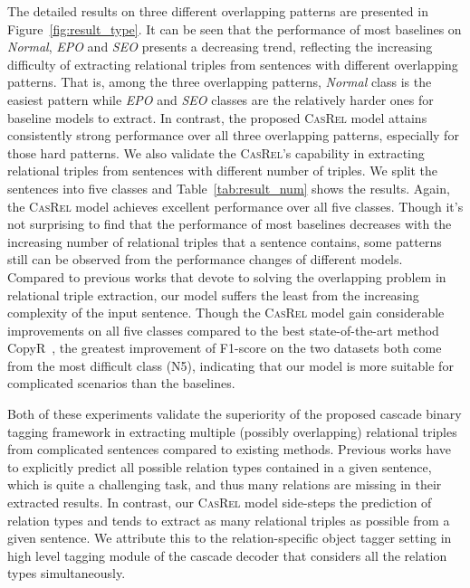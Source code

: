\documentclass[11pt,a4paper]{article}
\begin{document}
\par The detailed results on three different overlapping patterns are presented in Figure~\ref{fig:result_type}. It can be seen that the performance of most baselines on \emph{Normal}, \emph{EPO} and \emph{SEO} presents a decreasing trend, reflecting the increasing difficulty of extracting relational triples from sentences with different overlapping patterns. That is, among the three overlapping patterns, \emph{Normal} class is the easiest pattern while \emph{EPO} and \emph{SEO} classes are the relatively harder ones for baseline models to extract. In contrast, the proposed \textsc{CasRel} model attains consistently strong performance over all three overlapping patterns, especially for those hard patterns. We also validate the \textsc{CasRel}'s capability in extracting relational triples from sentences with different number of triples. We split the sentences into five classes and Table~\ref{tab:result_num} shows the results. Again, the \textsc{CasRel} model achieves excellent performance over all five classes. Though it's not surprising to find that the performance of most baselines decreases with the increasing number of relational triples that a sentence contains, some patterns still can be observed from the performance changes of different models. Compared to previous works that devote to solving the overlapping problem in relational triple extraction, our model suffers the least from the increasing complexity of the input sentence. Though the \textsc{CasRel} model gain considerable improvements on all five classes compared to the best state-of-the-art method CopyR~\cite{zeng2019Learning}, the greatest improvement of F1-score on the two datasets both come from the most difficult class (N5), indicating that our model is more suitable for complicated scenarios than the baselines.

\par Both of these experiments validate the superiority of the proposed cascade binary tagging framework in extracting multiple (possibly overlapping) relational triples from complicated sentences compared to existing methods. Previous works have to explicitly predict all possible relation types contained in a given sentence, which is quite a challenging task, and thus many relations are missing in their extracted results. In contrast, our \textsc{CasRel} model side-steps the prediction of relation types and tends to extract as many relational triples as possible from a given sentence. We attribute this to the relation-specific object tagger setting in high level tagging module of the cascade decoder that considers all the relation types simultaneously. 	
\end{document}
